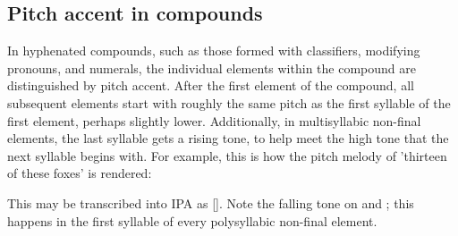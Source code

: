 \subsection{Pitch accent in compounds}\label{s:pitch-accent}
In hyphenated compounds, such as those formed with classifiers, modifying
pronouns, and numerals, the individual elements within the compound are
distinguished by pitch accent. After the first element of the compound, all
subsequent elements start with roughly the same pitch as the first syllable of
the first element, perhaps slightly lower. Additionally, in multisyllabic
non-final elements, the last syllable gets a rising tone, to help meet the high
tone that the next syllable begins with. For example, this is how the pitch
melody of  'thirteen of these foxes' is
rendered:

\begin{center}
\end{center}
\vspace{-1em}
\noindent This may be transcribed into IPA as [].
Note the falling tone on  and ; this happens in the first
syllable of every polysyllabic non-final element.
\pagebreak

